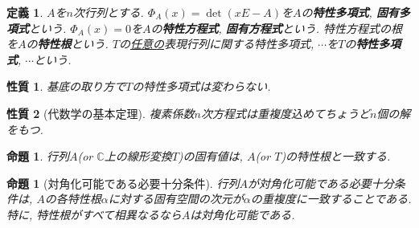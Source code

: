 \documentclass[a4j,dvipdfmx]{jsarticle}
\newcommand{\C}{\mathbb{C}}
\theoremstyle{mystyle}
\newtheorem*{definition}{定義}
\newtheorem{proposition}[theorem]{命題}
\newtheorem*{property}{性質}
\begin{document}
    \begin{definition}
        $A$を$n$次行列とする. $\Phi_A(x)=\det(xE-A)$を$A$の\textbf{特性多項式}, \textbf{固有多項式}という. $\Phi_A(x)=0$を$A$の\textbf{特性方程式}, \textbf{固有方程式}という. 特性方程式の根を$A$の\textbf{特性根}という.
        $T$の\underline{任意の}表現行列に関する特性多項式, $\cdots$を$T$の\textbf{特性多項式}, $\cdots$という.
    \end{definition}
    \begin{property}
        基底の取り方で$T$の特性多項式は変わらない.
    \end{property}
    \begin{property}[代数学の基本定理]
        複素係数$n$次方程式は重複度込めてちょうど$n$個の解をもつ.
    \end{property}
    \begin{proposition}
        行列$A$(or $\C$上の線形変換$T$)の固有値は, $A$(or $T$)の特性根と一致する.
    \end{proposition}
    \begin{proposition}[対角化可能である必要十分条件]
        行列$A$が対角化可能である必要十分条件は, $A$の各特性根$\alpha$に対する固有空間の次元が$\alpha$の重複度に一致することである. 特に, 特性根がすべて相異なるなら$A$は対角化可能である.
    \end{proposition}
    \clearpage
\end{document}
